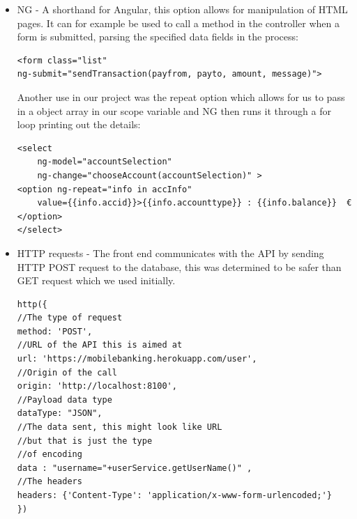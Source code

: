 \begin{itemize}
        \item NG - A shorthand for Angular, this option allows for manipulation of HTML pages.
        It can for example be used to call a method in the controller when a form is submitted,
        parsing the specified data fields in the process:
\begin{verbatim}
<form class="list" 
ng-submit="sendTransaction(payfrom, payto, amount, message)">
\end{verbatim}
        Another use in our project was the repeat option which allows for us to pass in a object array in our scope variable and NG then runs it through a for loop printing out the details:
\begin{verbatim}
<select 
    ng-model="accountSelection" 
    ng-change="chooseAccount(accountSelection)" >
<option ng-repeat="info in accInfo" 
    value={{info.accid}}>{{info.accounttype}} : {{info.balance}}  €  
</option>
</select>
\end{verbatim}
    \item HTTP requests - The front end communicates with the API by sending HTTP POST request to the database, this was determined to be safer than GET request which we used initially.
\begin{verbatim}
http({
//The type of request
method: 'POST',
//URL of the API this is aimed at
url: 'https://mobilebanking.herokuapp.com/user',
//Origin of the call
origin: 'http://localhost:8100',
//Payload data type
dataType: "JSON",
//The data sent, this might look like URL
//but that is just the type
//of encoding
data : "username="+userService.getUserName()" ,
//The headers
headers: {'Content-Type': 'application/x-www-form-urlencoded;'}
})
\end{verbatim}
\end{itemize}

